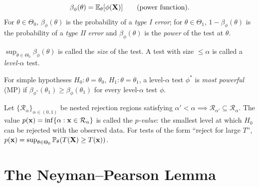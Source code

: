 \documentclass[main.tex]{subfiles}
\begin{document}
\begin{definition}
\[
\beta_\phi(\theta)=\mathbb{E}_\theta[\phi(\mathbf{X})]\qquad(\text{power function}).
\]
For $\theta\in\Theta_0$, $\beta_\phi(\theta)$ is the probability of a \emph{type I error}; for $\theta\in\Theta_1$, $1-\beta_\phi(\theta)$ is the probability of a \emph{type II error} and $\beta_\phi(\theta)$ is the \emph{power} of the test at $\theta$.
\end{definition}

\begin{definition}
$\sup_{\theta\in\Theta_0}\beta_\phi(\theta)$ is called the \emph{size} of the test. A test with size $\le\alpha$ is called a \emph{level-$\alpha$} test.
\end{definition}

\begin{definition}
For simple hypotheses $H_0:\theta=\theta_0$, $H_1:\theta=\theta_1$, a level-$\alpha$ test $\phi^*$ is \emph{most powerful} (MP) if $\beta_{\phi^*}(\theta_1)\ge\beta_\phi(\theta_1)$ for every level-$\alpha$ test $\phi$.
\end{definition}

\begin{definition}[$p$-Value]\label{def:p-degeri}
Let $\{\mathcal R_\alpha\}_{\alpha\in(0,1)}$ be nested rejection regions satisfying $\alpha'<\alpha\implies\mathcal R_{\alpha'}\subseteq\mathcal R_\alpha$. The value $p(\mathbf{x})=\inf\{\alpha:\mathbf{x}\in\mathcal R_\alpha\}$ is called the \emph{$p$-value}: the smallest level at which $H_0$ can be rejected with the observed data. For tests of the form ``reject for large $T$'', $p(\mathbf{x})=\sup_{\theta\in\Theta_0}\mathbb{P}_\theta(T(\mathbf{X})\ge T(\mathbf{x}))$.
\end{definition}

\section{The Neyman--Pearson Lemma}
\end{document}
